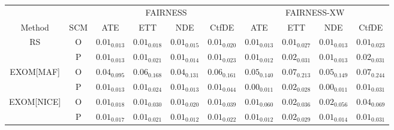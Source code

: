 
\label{tab:92}
\centering
\begin{tabular}{cccccccccc}
    \toprule
    \multicolumn{2}{c}{} & \multicolumn{4}{c}{FAIRNESS} & \multicolumn{4}{c}{FAIRNESS-XW}\\
    \cmidrule(r){3-6} \cmidrule(r){7-10}
    Method & SCM & ATE & ETT & NDE & CtfDE & ATE & ETT & NDE & CtfDE\\
    \midrule
    \multirow{2}{*}{RS} & O & $0.01_{0.013}$ & $0.01_{0.018}$ & $0.01_{0.015}$ & $0.01_{0.020}$ & $0.01_{0.013}$ & $0.01_{0.027}$ & $0.01_{0.013}$ & $0.01_{0.023}$\\
    & P & $0.01_{0.013}$ & $0.01_{0.021}$ & $0.01_{0.014}$ & $0.01_{0.023}$ & $0.01_{0.012}$ & $0.02_{0.031}$ & $0.01_{0.013}$ & $0.02_{0.031}$\\
    \midrule
    \multirow{2}{*}{EXOM[MAF]} & O & $0.04_{0.095}$ & $0.06_{0.168}$ & $0.04_{0.131}$ & $0.06_{0.161}$ & $0.05_{0.140}$ & $0.07_{0.213}$ & $0.05_{0.149}$ & $0.07_{0.244}$\\
    & P & $0.01_{0.013}$ & $0.01_{0.024}$ & $0.01_{0.013}$ & $0.01_{0.044}$ & $0.00_{0.011}$ & $0.02_{0.028}$ & $0.00_{0.011}$ & $0.01_{0.031}$\\
    \midrule
    \multirow{2}{*}{EXOM[NICE]} & O & $0.01_{0.018}$ & $0.01_{0.030}$ & $0.01_{0.020}$ & $0.01_{0.039}$ & $0.01_{0.060}$ & $0.02_{0.036}$ & $0.02_{0.056}$ & $0.04_{0.069}$\\
    & P & $0.01_{0.017}$ & $0.01_{0.021}$ & $0.01_{0.012}$ & $0.01_{0.022}$ & $0.01_{0.012}$ & $0.02_{0.029}$ & $0.01_{0.014}$ & $0.01_{0.031}$\\
    \bottomrule
\end{tabular}

